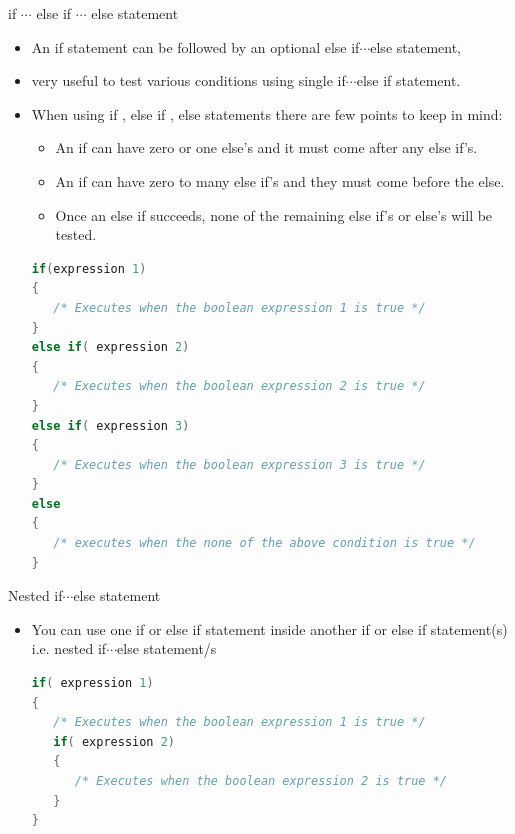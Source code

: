 \documentclass[10pt,t]{beamer}
\begin{document}
\begin{frame}[fragile]{if $\cdots$ else if $\cdots$ else statement}
  \begin{itemize}
    \item An if statement can be followed by an optional else if$\cdots$else statement,
    \item very useful to test various conditions using single if$\cdots$else if statement.
    \item When using if , else if , else statements there are few points to keep in mind:
    \begin{itemize}
      \item An if can have zero or one else's and it must come after any else if's.
      \item An if can have zero to many else if's and they must come before the else.
      \item Once an else if succeeds, none of the remaining else if's or else's will be tested.
    \end{itemize}
    \begin{lstlisting}[language=C,basicstyle=\scriptsize\ttfamily]
if(expression 1)
{
   /* Executes when the boolean expression 1 is true */
}
else if( expression 2)
{
   /* Executes when the boolean expression 2 is true */
}
else if( expression 3)
{
   /* Executes when the boolean expression 3 is true */
}
else 
{
   /* executes when the none of the above condition is true */
}
    \end{lstlisting}
  \end{itemize}
\end{frame}

\begin{frame}[fragile]{}
  
\end{frame}

\begin{frame}[fragile]{Nested if$\cdots$else statement}
  \begin{itemize}
    \item You can use one if or else if statement inside another if or else if statement(s) i.e. nested if$\cdots$else statement/s
      \begin{lstlisting}[language=C,basicstyle=\scriptsize\ttfamily]
if( expression 1)
{
   /* Executes when the boolean expression 1 is true */
   if( expression 2)
   {
      /* Executes when the boolean expression 2 is true */
   }
}
      \end{lstlisting}
  \end{itemize}
\end{frame}
\end{document}
